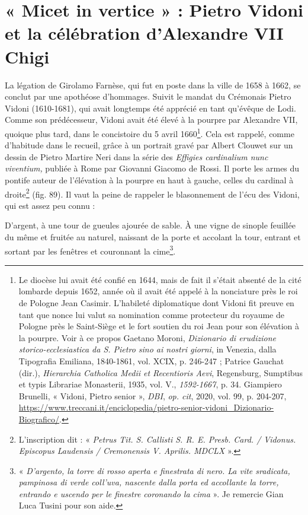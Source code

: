 \documentclass[12pt,twoside,openany]{book}
\renewenvironment{quote}
  {%
    \par\begingroup
    \fontsize{11pt}{14pt}\selectfont
    \list{}{\leftmargin=1.5em\rightmargin=1.5em}%
    \item\relax
  }
  {%
    \endlist
    \endgroup
  }
\newenvironment{PurhBlockQuote}
  {%
    \begin{quote}
  }
  {%
    \end{quote}
  }
\begin{document}
\section{« Micet in vertice » : Pietro Vidoni et la célébration d’Alexandre VII Chigi}

La légation de Girolamo Farnèse, qui fut en poste dans la ville de 1658 à 1662, se conclut par une apothéose d’hommages. Suivit le mandat du Crémonais Pietro Vidoni (1610-1681), qui avait longtemps été apprécié en tant qu’évêque de Lodi. Comme son prédécesseur, Vidoni avait été élevé à la pourpre par Alexandre VII, quoique plus tard, dans le concistoire du 5 avril 1660\footnote{Le diocèse lui avait été confié en 1644, mais de fait il s’était absenté de la cité lombarde depuis 1652, année où il avait été appelé à la nonciature près le roi de Pologne Jean Casimir. L’habileté diplomatique dont Vidoni fit preuve en tant que nonce lui valut sa nomination comme protecteur du royaume de Pologne près le Saint-Siège et le fort soutien du roi Jean pour son élévation à la pourpre. Voir à ce propos Gaetano Moroni, \textit{Dizionario di erudizione storico-ecclesiastica da S. Pietro sino ai nostri giorni}, in Venezia, dalla Tipografia Emiliana, 1840-1861, vol. XCIX, p. 246-247 ; Patrice Gauchat (dir.), \textit{Hierarchia Catholica Medii et Recentioris Aevi}, Regensburg, Sumptibus et typis Librariae Monasterii, 1935, vol. V., \textit{1592-1667}, p. 34. Giampiero Brunelli, « Vidoni, Pietro senior », \textit{DBI}, \textit{op. cit}, 2020, vol. 99, p. 204-207, \href{https://www.treccani.it/enciclopedia/pietro-senior-vidoni\_Dizionario-Biografico/}{https://www.treccani.it/enciclopedia/pietro-senior-vidoni\_Dizionario-Biografico/}.}. Cela est rappelé, comme d’habitude dans le recueil, grâce à un portrait gravé par Albert Clouwet sur un dessin de Pietro Martire Neri dans la série des \textit{Effigies cardinalium nunc viventium, }publiée à Rome par Giovanni Giacomo de Rossi. Il porte les armes du pontife auteur de l’élévation à la pourpre en haut à gauche, celles du cardinal à droite\footnote{L’inscription dit : « \textit{Petrus Tit. S. Callisti S. R. E. Presb. Card. / Vidonus. Episcopus Laudensis / Cremonensis V. Aprilis. MDCLX} ».} (fig. 89). Il vaut la peine de rappeler le blasonnement de l’écu des Vidoni, qui est assez peu connu :

\begin{PurhBlockQuote}
D’argent, à une tour de gueules ajourée de sable. À une vigne de sinople feuillée du même et fruitée au naturel, naissant de la porte et accolant la tour, entrant et sortant par les fenêtres et couronnant la cime\footnote{« \textit{D’argento, la torre di rosso aperta e finestrata di nero. La vite sradicata, pampinosa di verde coll’uva, nascente dalla porta ed accollante la torre, entrando e uscendo per le finestre coronando la cima} ». Je remercie Gian Luca Tusini pour son aide.}.
\end{PurhBlockQuote}
\end{document}
